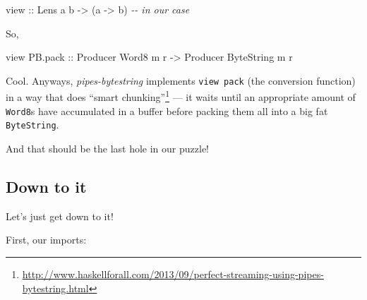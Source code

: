 \documentclass[]{article}
\newenvironment{Shaded}{}{}
\newcommand{\CommentTok}[1]{\textcolor[rgb]{0.38,0.63,0.69}{\textit{#1}}}
\newcommand{\DataTypeTok}[1]{\textcolor[rgb]{0.56,0.13,0.00}{#1}}
\newcommand{\NormalTok}[1]{#1}
\newcommand{\OtherTok}[1]{\textcolor[rgb]{0.00,0.44,0.13}{#1}}
\renewcommand{\href}[2]{#2\footnote{\url{#1}}}
\begin{document}
\begin{Shaded}
\begin{Highlighting}[]
\OtherTok{view ::} \DataTypeTok{Lens\textquotesingle{}}\NormalTok{ a b }\OtherTok{{-}>}\NormalTok{ (a }\OtherTok{{-}>}\NormalTok{ b)       }\CommentTok{{-}{-} in our case}
\end{Highlighting}
\end{Shaded}

So,

\begin{Shaded}
\begin{Highlighting}[]
\NormalTok{view PB.pack}\OtherTok{ ::} \DataTypeTok{Producer} \DataTypeTok{Word8}\NormalTok{      m r}
             \OtherTok{{-}>} \DataTypeTok{Producer} \DataTypeTok{ByteString}\NormalTok{ m r}
\end{Highlighting}
\end{Shaded}

Cool. Anyways, \emph{pipes-bytestring} implements \texttt{view\ pack} (the
conversion function) in a way that does
\href{http://www.haskellforall.com/2013/09/perfect-streaming-using-pipes-bytestring.html}{``smart
chunking''} --- it waits until an appropriate amount of \texttt{Word8}s have
accumulated in a buffer before packing them all into a big fat
\texttt{ByteString}.

And that should be the last hole in our puzzle!

\hypertarget{down-to-it}{%
\subsection{Down to it}\label{down-to-it}}

Let's just get down to it!

First, our imports:
\end{document}
